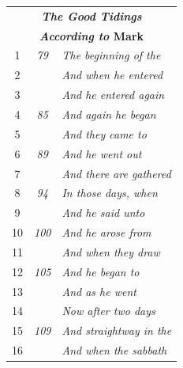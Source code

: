 \documentclass{article}
\newlength{\minipageheight}
\newlength{\minipagewidth}
\begin{document}
\begin{minipage}[r][\minipageheight][t]{\minipagewidth}
\begin{longtable}{ccl}
        \multicolumn{3}{c}{\textbf{\textit{The Good Tidings}}}        \\
        \multicolumn{3}{c}{\textbf{\textit{According to} Mark}}       \\
        \hline
        1           & \textit{79}   & \textit{The beginning of the}   \\
        2           &               & \textit{And when he entered}    \\
        3           &               & \textit{And he entered again}   \\
        4           & \textit{85}   & \textit{And again he began}     \\
        5           &               & \textit{And they came to}       \\
        6           & \textit{89}   & \textit{And he went out}        \\
        7           &               & \textit{And there are gathered} \\
        8           & \textit{94}   & \textit{In those days, when}    \\
        9           &               & \textit{And he said unto}       \\
        10          & \textit{100}  & \textit{And he arose from}      \\
        11          &               & \textit{And when they draw}     \\
        12          & \textit{105}  & \textit{And he began to}        \\
        13          &               & \textit{And as he went}         \\
        14          &               & \textit{Now after two days}     \\
        15          & \textit{109}  & \textit{And straightway in the} \\
        16          &               & \textit{And when the sabbath}   \\


\end{longtable}
\end{minipage}
\end{document}
